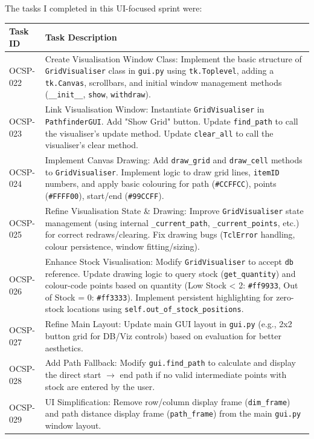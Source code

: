 The tasks I completed in this UI-focused sprint were:
\begin{table}[htbp]
	\centering
	\begin{tabularx}{\textwidth}{|l|X|}
		\hline
		\textbf{Task ID} & \textbf{Task Description} \\
		\hline
		OCSP-022 & Create Visualisation Window Class: Implement the basic structure of \verb|GridVisualiser| class in \verb|gui.py| using \verb|tk.Toplevel|, adding a \verb|tk.Canvas|, scrollbars, and initial window management methods (\verb|__init__|, \verb|show|, \verb|withdraw|). \\
		\hline
		OCSP-023 & Link Visualisation Window: Instantiate \verb|GridVisualiser| in \verb|PathfinderGUI|. Add "Show Grid" button. Update \verb|find_path| to call the visualiser's update method. Update \verb|clear_all| to call the visualiser's clear method. \\
		\hline
		OCSP-024 & Implement Canvas Drawing: Add \verb|draw_grid| and \verb|draw_cell| methods to \verb|GridVisualiser|. Implement logic to draw grid lines, \verb|itemID| numbers, and apply basic colouring for path (\verb|#CCFFCC|), points (\verb|#FFFF00|), start/end (\verb|#99CCFF|). \\
		\hline
		OCSP-025 & Refine Visualisation State \& Drawing: Improve \verb|GridVisualiser| state management (using internal \verb|_current_path|, \verb|_current_points|, etc.) for correct redraws/clearing. Fix drawing bugs (\verb|TclError| handling, colour persistence, window fitting/sizing). \\
		\hline
		OCSP-026 & Enhance Stock Visualisation: Modify \verb|GridVisualiser| to accept \verb|db| reference. Update drawing logic to query stock (\verb|get_quantity|) and colour-code points based on quantity (Low Stock < 2: \verb|#ff9933|, Out of Stock = 0: \verb|#ff3333|). Implement persistent highlighting for zero-stock locations using \verb|self.out_of_stock_positions|. \\
		\hline
		OCSP-027 & Refine Main Layout: Update main GUI layout in \verb|gui.py| (e.g., 2x2 button grid for DB/Viz controls) based on evaluation for better aesthetics. \\
		\hline
		OCSP-028 & Add Path Fallback: Modify \verb|gui.find_path| to calculate and display the direct start $ \rightarrow $ end path if no valid intermediate points with stock are entered by the user. \\
		\hline
		OCSP-029 & UI Simplification: Remove row/column display frame (\verb|dim_frame|) and path distance display frame (\verb|path_frame|) from the main \verb|gui.py| window layout. \\

\end{tabularx}
\end{table}
